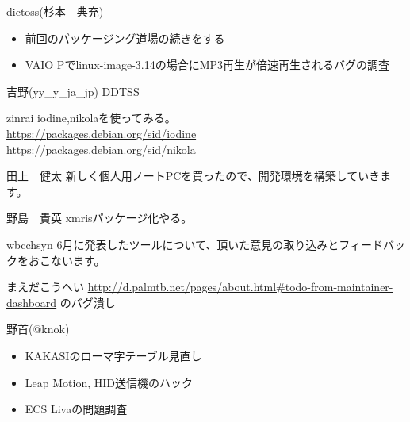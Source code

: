 \begin{prework}{ dictoss(杉本　典充) }
\begin{itemize}
\item 前回のパッケージング道場の続きをする
\item VAIO Pでlinux-image-3.14の場合にMP3再生が倍速再生されるバグの調査
\end{itemize}
\end{prework}

\begin{prework}{ 吉野(yy\_{}y\_{}ja\_{}jp) }
DDTSS
\end{prework}

\begin{prework}{ zinrai }
iodine,nikolaを使ってみる。\\
\url{https://packages.debian.org/sid/iodine}\\
\url{https://packages.debian.org/sid/nikola}
\end{prework}

\begin{prework}{ 田上　健太 }
新しく個人用ノートPCを買ったので、開発環境を構築していきます。
\end{prework}

\begin{prework}{ 野島　貴英 }
xmrisパッケージ化やる。
\end{prework}

\begin{prework}{ wbcchsyn }
6月に発表したツールについて、頂いた意見の取り込みとフィードバックをおこないます。
\end{prework}

\begin{prework}{ まえだこうへい }
\url{http://d.palmtb.net/pages/about.html#todo-from-maintainer-dashboard}
のバグ潰し
\end{prework}

\begin{prework}{ 野首(@knok) }
\begin{itemize}
\item KAKASIのローマ字テーブル見直し
\item Leap Motion, HID送信機のハック
\item ECS Livaの問題調査
\end{itemize}
\end{prework}
